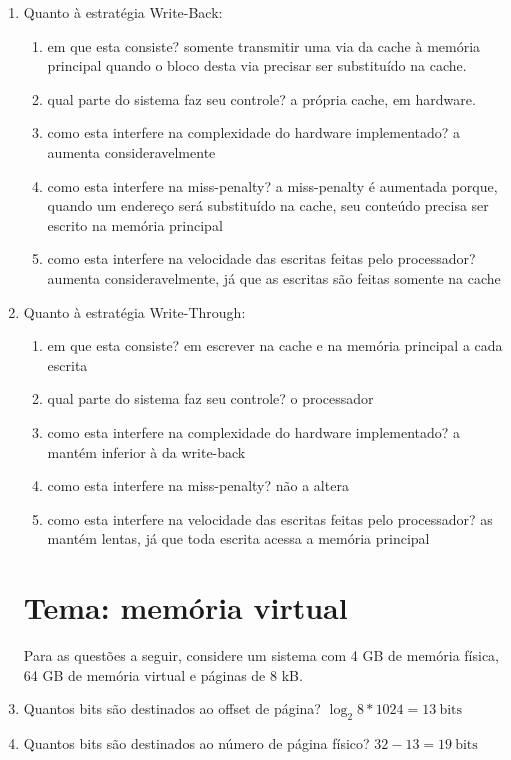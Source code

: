 \documentclass{article}
\begin{document}
\begin{enumerate}
\item Quanto à estratégia Write-Back:
\begin{enumerate}
    \item em que esta consiste? somente transmitir uma via da cache à memória principal quando o bloco desta via precisar ser substituído na cache.
    \item qual parte do sistema faz seu controle? a própria cache, em hardware.
    \item como esta interfere na complexidade do hardware implementado? a aumenta consideravelmente
    \item como esta interfere na miss-penalty? a miss-penalty é aumentada porque, quando um endereço será substituído na cache, seu conteúdo precisa ser escrito na memória principal
    \item como esta interfere na velocidade das escritas feitas pelo processador? aumenta consideravelmente, já que as escritas são feitas somente na cache
\end{enumerate}

\item Quanto à estratégia Write-Through:
\begin{enumerate}
    \item em que esta consiste? em escrever na cache e na memória principal a cada escrita
    \item qual parte do sistema faz seu controle? o processador
    \item como esta interfere na complexidade do hardware implementado? a mantém inferior à da write-back
    \item como esta interfere na miss-penalty? não a altera
    \item como esta interfere na velocidade das escritas feitas pelo processador? as mantém lentas, já que toda escrita acessa a memória principal
\end{enumerate}

\section*{Tema: memória virtual}

Para as questões a seguir, considere um sistema com 4 GB de memória física, 64 GB de memória virtual e páginas de 8 kB.

\item Quantos bits são destinados ao offset de página? $\log_2{8*1024} = 13\ \text{bits}$

\item Quantos bits são destinados ao número de página físico? $32 - 13 = 19\ \text{bits}$


\end{enumerate}
\end{document}
